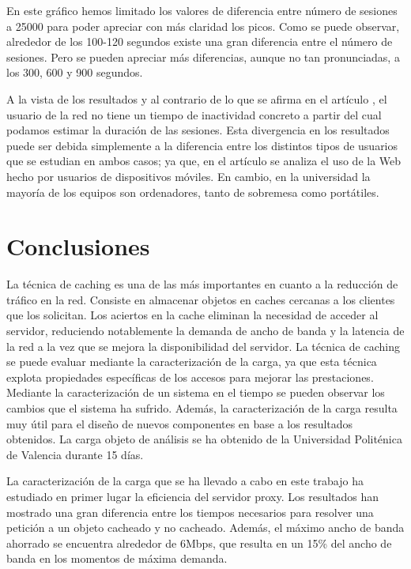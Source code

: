 \documentclass[twocolumn]{Jornadas}
\begin{document}
En este gráfico hemos limitado los valores de diferencia entre número de sesiones a 25000 para poder apreciar con más claridad los picos. Como se puede observar, alrededor de los 100-120 segundos existe una gran diferencia entre el número de sesiones. Pero se pueden apreciar más diferencias, aunque no tan pronunciadas, a los 300, 600 y 900 segundos.

A la vista de los resultados y al contrario de lo que se afirma en el artículo \cite{}, el usuario de la red no tiene un tiempo de inactividad concreto a partir del cual podamos estimar la duración de las sesiones. Esta divergencia en los resultados puede ser debida simplemente a la diferencia entre los distintos tipos de usuarios que se estudian en ambos casos; ya que, en el artículo \cite{} se analiza el uso de la Web hecho por usuarios de dispositivos móviles. En cambio, en la universidad la mayoría de los equipos son ordenadores, tanto de sobremesa como portátiles.

\section{Conclusiones}
\label{conclusiones}

La técnica de caching es una de las más importantes en cuanto a la reducción de tráfico en la red. Consiste en almacenar objetos en caches cercanas a los clientes que los solicitan. Los aciertos en la cache eliminan la necesidad de acceder al servidor, reduciendo notablemente la demanda de ancho de banda y la latencia de la red a la vez que se mejora la disponibilidad del servidor. La técnica de caching se puede evaluar mediante la caracterización de la carga, ya que esta técnica explota propiedades específicas de los accesos para mejorar las prestaciones.
Mediante la caracterización de un sistema en el tiempo se pueden observar los cambios que el sistema ha sufrido. Además, la caracterización de la carga resulta muy útil para el diseño de nuevos componentes en base a los resultados obtenidos. La carga objeto de análisis se ha obtenido de la Universidad Politénica de Valencia durante 15 días.

La caracterización de la carga que se ha llevado a cabo en este trabajo ha estudiado en primer lugar la eficiencia del servidor proxy.
Los resultados han mostrado una gran diferencia entre los tiempos necesarios para resolver una petición a un objeto cacheado y no cacheado. Además, el máximo ancho de banda ahorrado se encuentra alrededor de 6Mbps, que resulta en un 15\% del ancho de banda en los momentos de máxima demanda. 
\end{document}
